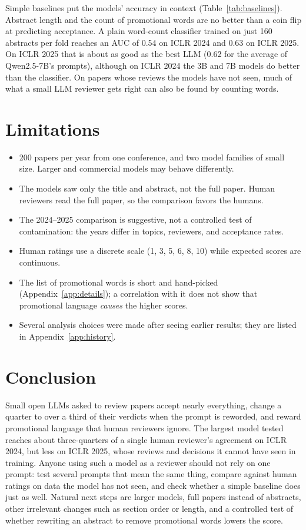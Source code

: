 \documentclass[11pt]{article}
\begin{document}
Simple baselines put the models' accuracy in context (Table~\ref{tab:baselines}). Abstract length and the count of promotional words are no better than a coin flip at predicting acceptance. A plain word-count classifier trained on just 160 abstracts per fold reaches an AUC of 0.54 on ICLR 2024 and 0.63 on ICLR 2025. On ICLR 2025 that is about as good as the best LLM (0.62 for the average of Qwen2.5-7B's prompts), although on ICLR 2024 the 3B and 7B models do better than the classifier. On papers whose reviews the models have not seen, much of what a small LLM reviewer gets right can also be found by counting words.

\section{Limitations}
\begin{itemize}
  \item 200 papers per year from one conference, and two model families of small size. Larger and commercial models may behave differently.
  \item The models saw only the title and abstract, not the full paper. Human reviewers read the full paper, so the comparison favors the humans.
  \item The 2024--2025 comparison is suggestive, not a controlled test of contamination: the years differ in topics, reviewers, and acceptance rates.
  \item Human ratings use a discrete scale (1, 3, 5, 6, 8, 10) while expected scores are continuous.
  \item The list of promotional words is short and hand-picked (Appendix~\ref{app:details}); a correlation with it does not show that promotional language \emph{causes} the higher scores.
  \item Several analysis choices were made after seeing earlier results; they are listed in Appendix~\ref{app:history}.
\end{itemize}

\section{Conclusion}
Small open LLMs asked to review papers accept nearly everything, change a quarter to over a third of their verdicts when the prompt is reworded, and reward promotional language that human reviewers ignore. The largest model tested reaches about three-quarters of a single human reviewer's agreement on ICLR 2024, but less on ICLR 2025, whose reviews and decisions it cannot have seen in training. Anyone using such a model as a reviewer should not rely on one prompt: test several prompts that mean the same thing, compare against human ratings on data the model has not seen, and check whether a simple baseline does just as well. Natural next steps are larger models, full papers instead of abstracts, other irrelevant changes such as section order or length, and a controlled test of whether rewriting an abstract to remove promotional words lowers the score.
\end{document}
